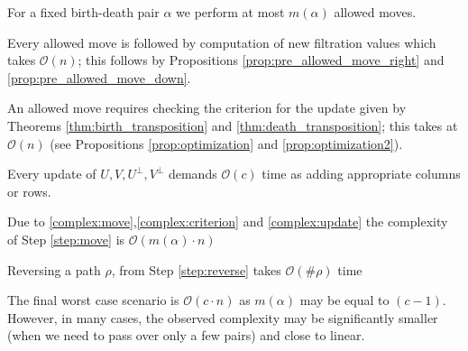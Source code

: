 \documentclass[a4paper,12pt, USenglish,cleveref,autoref,thm-restate]{article}
\newcommand{\mU}{U}
\newcommand{\hmU}{\mU}
\newcommand{\cmU}{\mU^{\perp}}
\newcommand{\mV}{V}
\newcommand{\cmV}{V^{\perp}}
\newcommand{\bds}{\alpha}
\def\card#1{\##1}
\begin{document}
\begin{appendices}
\begin{bracketenumerate}
    \item For a fixed birth-death pair $\bds$ we perform at most  $m(\bds)$ allowed moves.

    \item Every allowed move is followed by computation of new filtration values which takes $\mathcal{O}(n)$; this follows by Propositions \ref{prop:pre_allowed_move_right} and \ref{prop:pre_allowed_move_down}.\label{complex:move}

    \item An allowed move requires checking the criterion for the update given by Theorems \ref{thm:birth_transposition} and \ref{thm:death_transposition};
        this takes at $\mathcal{O}(n)$
            (see Propositions \ref{prop:optimization} and \ref{prop:optimization2}).  \label{complex:criterion}
    \item \label{complex:update} Every update of $\hmU,\mV,\cmU,\cmV$ demands $\mathcal{O}(c)$ time as adding appropriate columns or rows.
    \item Due to \ref{complex:move},\ref{complex:criterion}
     and \ref{complex:update} the complexity of Step \ref{step:move} is $\mathcal{O}(m(\bds) \cdot n)$ 
    \item Reversing a path $\rho$, from Step \ref{step:reverse} takes $\mathcal{O}(\card{\rho})$ time
\end{bracketenumerate}


\noindent The final worst case scenario is $\mathcal{O}(c \cdot n)$ as $m(\bds)$ may be equal to $(c-1)$. However, in many cases, the observed complexity may be significantly smaller (when we need to pass over only a few pairs) and close to linear.



\end{appendices}
\end{document}

